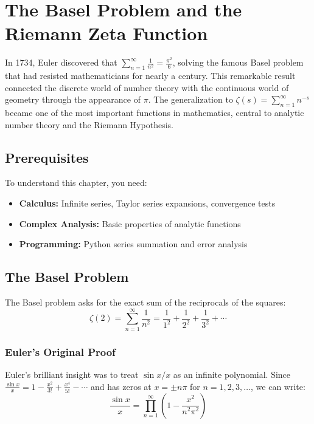 
\chapter{The Basel Problem and the Riemann Zeta Function}

\begin{historical}
In 1734, Euler discovered that $\sum_{n=1}^{\infty} \frac{1}{n^2} = \frac{\pi^2}{6}$, solving the famous Basel problem that had resisted mathematicians for nearly a century. This remarkable result connected the discrete world of number theory with the continuous world of geometry through the appearance of $\pi$. The generalization to $\zeta(s) = \sum_{n=1}^{\infty} n^{-s}$ became one of the most important functions in mathematics, central to analytic number theory and the Riemann Hypothesis.
\end{historical}

\section{Prerequisites}

To understand this chapter, you need:
\begin{itemize}
    \item \textbf{Calculus:} Infinite series, Taylor series expansions, convergence tests
    \item \textbf{Complex Analysis:} Basic properties of analytic functions
    \item \textbf{Programming:} Python series summation and error analysis
\end{itemize}

\section{The Basel Problem}

The Basel problem asks for the exact sum of the reciprocals of the squares:
\[
\zeta(2) = \sum_{n=1}^{\infty} \frac{1}{n^2} = \frac{1}{1^2} + \frac{1}{2^2} + \frac{1}{3^2} + \cdots
\]

\subsection{Euler's Original Proof}

Euler's brilliant insight was to treat $\sin x / x$ as an infinite polynomial. Since
$\frac{\sin x}{x} = 1 - \frac{x^2}{3!} + \frac{x^4}{5!} - \cdots$ and has zeros at
$x = \pm n\pi$ for $n = 1, 2, 3, \ldots$, we can write:
\[
\frac{\sin x}{x} = \prod_{n=1}^{\infty} \left(1 - \frac{x^2}{n^2 \pi^2}\right)
\]

